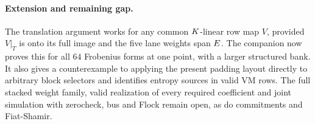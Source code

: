 \documentclass[11pt]{article}
\begin{document}
\paragraph{Extension and remaining gap.} The translation argument works for any common $K$-linear row map $V$, provided $V|_T$ is onto its full image and the five lane weights span $E$. The companion  now proves this for all $64$ Frobenius forms at one point, with a larger structured bank. It also gives a counterexample to applying the present padding layout directly to arbitrary block selectors and identifies entropy sources in valid VM rows. The full stacked weight family, valid realization of every required coefficient and joint simulation with zerocheck, bus and Flock remain open, as do commitments and Fiat-Shamir.
\end{document}
